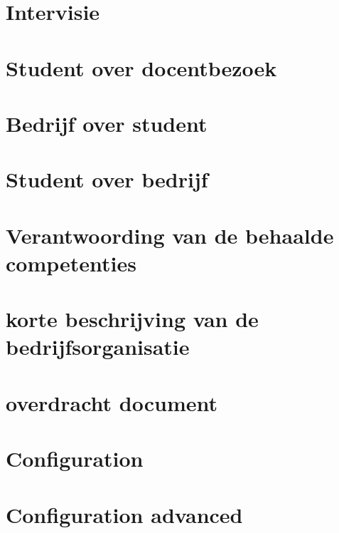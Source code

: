 \documentclass{mimosis}
\begin{document}
\begin{appendices}
\appendixpage
\noappendicestocpagenum
\addappheadtotoc
\chapter{Intervisie}

\chapter{Student over docentbezoek}

\chapter{Bedrijf over student}

\chapter{Student over bedrijf}

\chapter{Verantwoording van de behaalde competenties}

\chapter{korte beschrijving van de bedrijfsorganisatie}

\chapter{overdracht document}
\label{overdracht}

\chapter{Configuration}
\label{Configuration.h}

\chapter{Configuration advanced}
\label{Configuration_adv.h}

\end{appendices}

\backmatter
\end{document}
